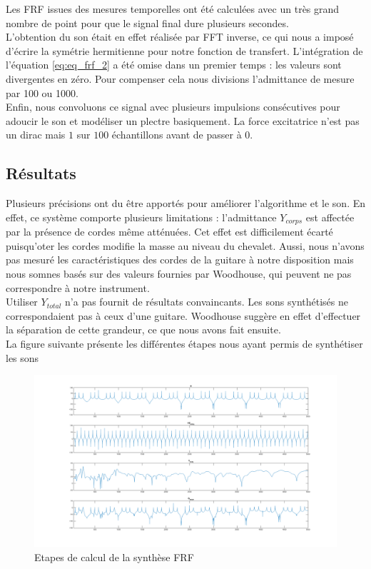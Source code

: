 Les FRF issues des mesures temporelles ont été calculées avec un très grand
nombre de point pour que le signal final dure plusieurs secondes.\\

L'obtention du son était en effet réalisée par FFT inverse, ce qui nous a
imposé d'écrire la symétrie hermitienne pour notre fonction de transfert.
L'intégration de l'équation \ref{eq:eq_frf_2} a été omise dans un premier temps
: les valeurs sont divergentes en zéro. Pour compenser cela nous divisions
l'admittance de mesure par 100 ou 1000.\\

Enfin, nous convoluons ce signal avec plusieurs impulsions consécutives pour
adoucir le son et modéliser un plectre basiquement. La force excitatrice n'est
pas un dirac mais $1$ sur $100$ échantillons avant de passer à 0.

\subsection{Résultats}
%
Plusieurs précisions ont du être apportés pour améliorer l'algorithme et le
son. En effet, ce système comporte plusieurs limitations : l'admittance
$Y_{corps}$ est affectée par la présence de cordes même atténuées. Cet effet
est difficilement écarté puisqu'oter les cordes modifie la masse au niveau du
chevalet. Aussi, nous n'avons pas mesuré les caractéristiques des cordes de la
guitare à notre disposition mais nous somnes basés sur des valeurs fournies par
Woodhouse, qui peuvent ne pas correspondre à notre instrument.  \\

Utiliser $Y_{total}$ n'a pas fournit de résultats convaincants. Les sons
synthétisés ne correspondaient pas à ceux d'une guitare. Woodhouse suggère en
effet d'effectuer la séparation de cette grandeur, ce que nous avons fait
ensuite.\\

La figure suivante présente les différentes étapes nous ayant permis de
synthétiser les sons

\begin{figure}[h]
\centering
\includegraphics[width=\linewidth]{figures/frf_rapport_intermediaire.png}
\caption{Etapes de calcul de la synthèse FRF}
\label{fig:FRF1}
\end{figure}

